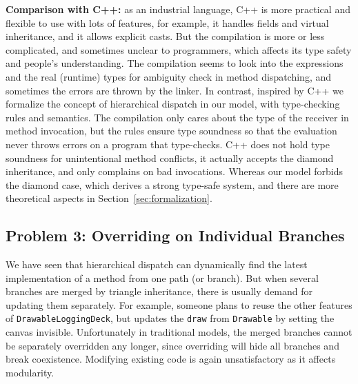 \noindent\textbf{Comparison with C++:} as an industrial language, C++ is more practical and flexible to use with lots of features, for example, it handles fields and virtual inheritance, and it allows explicit casts. But the compilation is more or less complicated, and sometimes unclear to programmers, which affects its type safety and people's understanding. The compilation seems to look into the expressions and the real (runtime) types for ambiguity check in method dispatching, and sometimes the errors are thrown by the linker. In contrast, inspired by C++ we formalize the concept of hierarchical dispatch in our model, with type-checking rules and semantics. The compilation only cares about the type of the receiver in method invocation, but the rules ensure type soundness so that the evaluation never throws errors on a program that type-checks. C++ does not hold type soundness for unintentional method conflicts, it actually accepts the diamond inheritance, and only complains on bad invocations. Whereas our model forbids the diamond case, which derives a strong type-safe system, and there are more theoretical aspects in Section~\ref{sec:formalization}. 

\subsection{Problem 3: Overriding on Individual Branches}\label{subsec:partialoverrides}

We have seen that hierarchical dispatch can dynamically find the latest implementation of a method from one path (or branch). But when
several branches are merged by triangle inheritance, there is usually demand for updating them separately. For example, someone plans to
reuse the other features of \lstinline|DrawableLoggingDeck|, but updates the \lstinline|draw| from \lstinline|Drawable| by setting the canvas
invisible. Unfortunately in traditional models, the merged branches cannot be separately overridden any longer, since overriding
will hide all branches and break coexistence. Modifying existing code is again unsatisfactory as it affects modularity.\\

